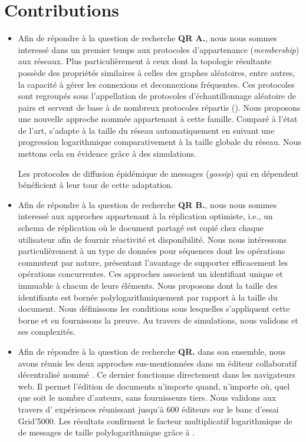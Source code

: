 
\section{Contributions}

\begin{itemize}
\item Afin de répondre à la question de recherche \textbf{QR A.}, nous nous
  sommes interessé dans un premier temps aux protocoles d'appartenance
  (\emph{membership}) aux réseaux. Plus particulièrement à ceux dont la
  topologie résultante possède des propriétés similaires à celles des graphes
  aléatoires, entre autres, la capacité à gérer les connexions et deconnexions
  fréquentes. Ces protocoles sont regroupés sous l'appellation de protocoles
  d'échantillonnage aléatoire de pairs et servent de base à de nombreux
  protocoles répartis (\REF). Nous proposons une nouvelle approche nommée \SPRAY
  appartenant à cette famille. Comparé à l'état de l'art, \SPRAY s'adapte à la
  taille du réseau automatiquement en suivant une progression logarithmique
  comparativement à la taille globale du réseau. Nous mettons cela en évidence
  grâce à des simulations.

  Les protocoles de diffusion épidémique de messages (\emph{gossip}) qui en
  dépendent bénéficient à leur tour de cette adaptation. 

\item Afin de répondre à la question de recherche \textbf{QR B.}, nous nous
  sommes interessé aux approches appartenant à la réplication optimiste, i.e.,
  un schema de réplication où le document partagé est copié chez chaque
  utilisateur afin de fournir réactivité et disponibilité. Nous nous intéressons
  particulièrement à un type de données pour séquences dont les opérations
  commutent par nature, présentant l'avantage de supporter efficacement les
  opérations concurrentes. Ces approches associent un identifiant unique et
  immuable à chacun de leurs éléments. Nous proposons \LSEQ dont la taille des
  identifiants est bornée polylogarithmiquement par rapport à la taille du
  document. Nous définissons les conditions sous lesquelles s'appliquent cette
  borne et en fournissons la preuve. Au travers de simulations, nous validons
  \LSEQ et ses complexités.

\item Afin de répondre à la question de recherche \textbf{QR.} dans son
  ensemble, nous avons réunis les deux approches sus-mentionnées dans un éditeur
  collaboratif décentralisé nommé \CRATE. Ce dernier fonctionne directement dans
  les navigateurs web. Il permet l'édition de documents n'importe quand,
  n'importe où, quel que soit le nombre d'auteurs, sans fournisseurs tiers. Nous
  validons \CRATE aux travers d' expériences réunissant jusqu'à 600 éditeurs sur
  le banc d'essai Grid'5000. Les résultats confirment le facteur multiplicatif
  logarithmique de \SPRAY de messages de taille polylogarithmique grâce à \LSEQ.

\end{itemize}

